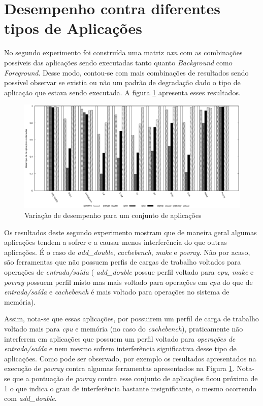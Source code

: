 \section{Desempenho contra diferentes tipos de Aplicações}
\label{sec:exp2}
No segundo experimento foi construída uma matriz  \textit{nxn} com as combinações possíveis das aplicações sendo executadas tanto quanto \textit{Background } como \textit{Foreground}. Desse modo, contou-se com mais combinações de resultados sendo possível observar se existia ou não um padrão de degradação dado o tipo de aplicação que estava sendo executada. A figura \ref{second_experiment} apresenta esses resultados. %

\begin{figure}[!h]
\centering
\includegraphics [keepaspectratio=true,scale=0.5]{graficos/exp_2_foreground.eps}
\caption{Variação de desempenho para um conjunto de aplicações}
\label{second_experiment}
\end{figure} 

Os resultados deste segundo experimento mostram que de maneira geral algumas aplicações tendem a sofrer e a causar menos interferência do que outras aplicações. É o caso de \textit{add\_double}, \textit{cachebench}, \textit{make} e \textit{povray}. Não por acaso, são ferramentas que não possuem perfis de cargas de trabalho voltados para operações de \textit{entrada/saída} ( \textit{add\_double} possue perfil voltado para \textit{cpu}, \textit{make} e \textit{povray} possuem perfil misto mas mais voltado para operações em \textit{cpu} do que de \textit{entrada/saída} e \textit{cachebench} é mais voltado para operações no sistema de memória). 

Assim, nota-se que essas aplicações, por possuirem um perfil de carga de trabalho voltado mais para \textit{cpu} e memória (no caso do \textit{cachebench}), praticamente não interferem em aplicações que possuem um perfil voltado para \textit{operações de entrada/saída} e nem mesmo sofrem interferência significativa desse tipo de aplicações. Como pode ser observado, por exemplo os resultados apresentados na execução de \textit{povray} contra algumas ferramentas apresentados na Figura \ref{second_experiment}. Nota-se que a pontuação de \textit{povray} contra esse conjunto de aplicações ficou próxima de 1 o que indica o grau de interferência bastante insignificante, o mesmo ocorrendo com \textit{add\_double}.

